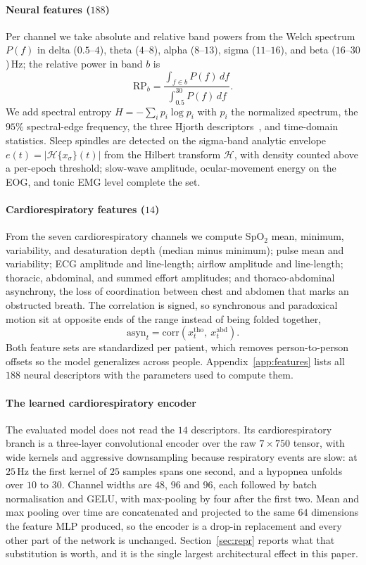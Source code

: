 \documentclass{ieeeaccess}
\begin{document}
\paragraph{Neural features ($188$)}
Per channel we take absolute and relative band powers from the Welch spectrum $P(f)$ in delta
($0.5$--$4$), theta ($4$--$8$), alpha ($8$--$13$), sigma ($11$--$16$), and beta
($16$--$30$)\,Hz; the relative power in band $b$ is
\begin{equation}
\mathrm{RP}_b=\frac{\int_{f\in b}P(f)\,df}{\int_{0.5}^{30}P(f)\,df}.
\end{equation}
We add spectral entropy $H=-\sum_i p_i\log p_i$ with $p_i$ the normalized spectrum, the
$95\%$ spectral-edge frequency, the three Hjorth descriptors~\cite{hjorth1970eeg}, and
time-domain statistics. Sleep spindles are detected on the sigma-band analytic envelope
$e(t)=\lvert\mathcal{H}\{x_\sigma\}(t)\rvert$ from the Hilbert transform $\mathcal{H}$, with
density counted above a per-epoch threshold; slow-wave amplitude, ocular-movement energy on
the EOG, and tonic EMG level complete the set.

\paragraph{Cardiorespiratory features ($14$)}
From the seven cardiorespiratory channels we compute SpO$_2$ mean, minimum, variability, and
desaturation depth (median minus minimum); pulse mean and variability; ECG amplitude and
line-length; airflow amplitude and line-length; thoracic, abdominal, and summed effort
amplitudes; and thoraco-abdominal asynchrony, the loss of coordination between chest and
abdomen that marks an obstructed breath. The correlation is signed, so synchronous and
paradoxical motion sit at opposite ends of the range instead of being folded together,
\begin{equation}
\mathrm{asyn}_t=\mathrm{corr}(x^{\mathrm{tho}}_t,\ x^{\mathrm{abd}}_t).
\end{equation}
Both feature sets are standardized per patient, which removes person-to-person offsets so the
model generalizes across people. Appendix~\ref{app:features} lists all $188$ neural
descriptors with the parameters used to compute them.

\paragraph{The learned cardiorespiratory encoder}
The evaluated model does not read the $14$ descriptors. Its cardiorespiratory branch is a
three-layer convolutional encoder over the raw $7\times750$ tensor, with wide kernels and
aggressive downsampling because respiratory events are slow: at $25$\,Hz the first kernel of
$25$ samples spans one second, and a hypopnea unfolds over $10$ to $30$. Channel widths are
$48$, $96$ and $96$, each followed by batch normalisation and GELU, with max-pooling by four
after the first two. Mean and max pooling over time are concatenated and projected to the same
$64$ dimensions the feature MLP produced, so the encoder is a drop-in replacement and every
other part of the network is unchanged. Section~\ref{sec:repr} reports what that substitution
is worth, and it is the single largest architectural effect in this paper.
\end{document}
